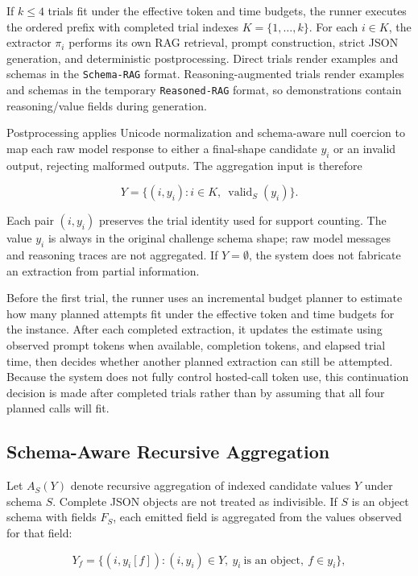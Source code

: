 If \(k\leq 4\) trials fit under the effective token and time budgets, the runner executes the ordered prefix with completed trial indexes \(K=\{1,\ldots,k\}\). For each \(i\in K\), the extractor \(\pi_i\) performs its own RAG retrieval, prompt construction, strict JSON generation, and deterministic postprocessing. Direct trials render examples and schemas in the \texttt{Schema-RAG} format. Reasoning-augmented trials render examples and schemas in the temporary \texttt{Reasoned-RAG} format, so demonstrations contain reasoning/value fields during generation.

Postprocessing applies Unicode normalization and schema-aware null coercion to map each raw model response to either a final-shape candidate \(y_i\) or an invalid output, rejecting malformed outputs. The aggregation input is therefore

\[
Y=\{(i,y_i): i\in K,\ \operatorname{valid}_S(y_i)\}.
\]

Each pair \((i,y_i)\) preserves the trial identity used for support counting. The value \(y_i\) is always in the original challenge schema shape; raw model messages and reasoning traces are not aggregated. If \(Y=\emptyset\), the system does not fabricate an extraction from partial information.

Before the first trial, the runner uses an incremental budget planner to estimate how many planned attempts fit under the effective token and time budgets for the instance. After each completed extraction, it updates the estimate using observed prompt tokens when available, completion tokens, and elapsed trial time, then decides whether another planned extraction can still be attempted. Because the system does not fully control hosted-call token use, this continuation decision is made after completed trials rather than by assuming that all four planned calls will fit.

\subsection{Schema-Aware Recursive Aggregation}

Let \(A_S(Y)\) denote recursive aggregation of indexed candidate values \(Y\) under schema \(S\). Complete JSON objects are not treated as indivisible. If \(S\) is an object schema with fields \(F_S\), each emitted field is aggregated from the values observed for that field:

\[
Y_f=\{(i,y_i[f]): (i,y_i)\in Y,\ y_i\ \text{is an object},\ f\in y_i\},
\]

